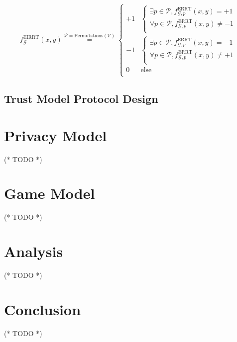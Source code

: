 \documentclass{article}
\begin{document}
\begin{equation}
f_{\mathcal{G}}^{\text{EIRRT}}(x,y)\overset{\mathcal{P}=\text{Permutations}(\mathcal{V})}{=}\left\{
\begin{array}{cc}
 +1 & \left\{
\begin{array}{c}
 \exists \mathit{p}\in \mathcal{P},f_{\mathcal{G},\mathit{p}}^{\text{ERRT}}(x,y)=+1 \\
 \forall \mathit{p}\in \mathcal{P},f_{\mathcal{G},\mathit{p}}^{\text{ERRT}}(x,y)\neq -1 \\
\end{array}
\right. \\
 -1 & \left\{
\begin{array}{c}
 \exists \mathit{p}\in \mathcal{P},f_{\mathcal{G},\mathit{p}}^{\text{ERRT}}(x,y)=-1 \\
 \forall \mathit{p}\in \mathcal{P},f_{\mathcal{G},\mathit{p}}^{\text{ERRT}}(x,y)\neq +1 \\
\end{array}
\right. \\
 0 & \text{else} \\
\end{array}
\right.
\end{equation}


\subsection{Trust Model Protocol Design}


\section{Privacy Model}

(* TODO *)


\section{Game Model}

(* TODO *)


\section{Analysis}

(* TODO *)


\section{Conclusion}

(* TODO *)
\end{document}
